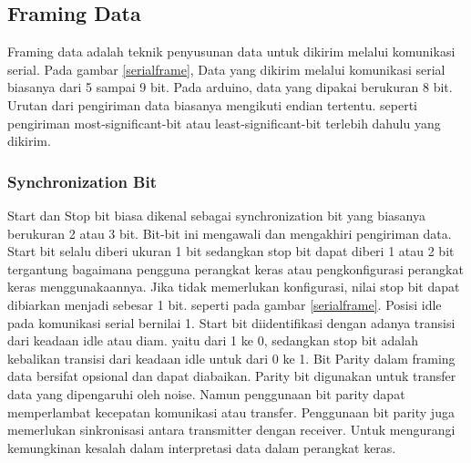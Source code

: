 \subsection{Framing Data}
Framing data adalah teknik penyusunan data untuk dikirim melalui komunikasi serial. Pada gambar \ref{serialframe}, Data yang dikirim melalui komunikasi serial biasanya dari 5 sampai 9 bit. Pada arduino, data yang dipakai berukuran 8 bit. Urutan dari pengiriman data biasanya mengikuti endian tertentu. seperti pengiriman most-significant-bit atau least-significant-bit terlebih dahulu yang dikirim.
\subsubsection{Synchronization Bit}
Start dan Stop bit biasa dikenal sebagai synchronization bit yang biasanya berukuran 2 atau 3 bit. Bit-bit ini mengawali dan mengakhiri pengiriman data. Start bit selalu diberi ukuran 1 bit sedangkan stop bit dapat diberi 1 atau 2 bit tergantung bagaimana pengguna perangkat keras atau pengkonfigurasi perangkat keras menggunakaannya. Jika tidak memerlukan konfigurasi, nilai stop bit dapat dibiarkan menjadi sebesar 1 bit. seperti pada gambar \ref{serialframe}.
Posisi idle pada komunikasi serial bernilai 1. Start bit diidentifikasi dengan adanya transisi dari keadaan idle atau diam. yaitu dari 1 ke 0, sedangkan stop bit adalah kebalikan transisi dari keadaan idle untuk dari 0 ke 1.
Bit Parity dalam framing data bersifat opsional dan dapat diabaikan. Parity bit digunakan untuk transfer data yang dipengaruhi oleh noise. Namun penggunaan bit parity dapat memperlambat kecepatan komunikasi atau transfer. Penggunaan bit parity juga memerlukan sinkronisasi antara transmitter dengan receiver. Untuk mengurangi kemungkinan kesalah dalam interpretasi data dalam perangkat keras.

